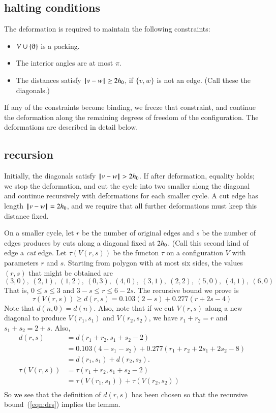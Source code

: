 \subsection{halting conditions}

The deformation is required to maintain the following
constraints:
\begin{itemize}
\item $V\cup\{\orgn\}$ is a packing.
\item The interior angles are at most $\pi$.
\item The distances satisfy ${\hskip0.1em|\hskip-0.15em|\hskip0.1em}v - w{\hskip0.1em|\hskip-0.15em|\hskip0.1em}\ge 2{h_0}$, if $\{v,w\}$ is
not an edge.  (Call these the diagonals.)
\end{itemize}
If any of the constraints become binding, we freeze that
constraint, and continue the deformation along the remaining degrees of freedom of the configuration.  The deformations are described in detail below.

\subsection{recursion}

Initially, the diagonals satisfy ${\hskip0.1em|\hskip-0.15em|\hskip0.1em}v - w{\hskip0.1em|\hskip-0.15em|\hskip0.1em}>2{h_0}$.
If after deformation, equality holds; we stop the deformation, and cut the cycle into two smaller along the diagonal
and continue recursively with deformations for each smaller cycle.  A cut edge has length ${\hskip0.1em|\hskip-0.15em|\hskip0.1em}v - w{\hskip0.1em|\hskip-0.15em|\hskip0.1em}=2{h_0}$, and
we require that all further deformations must keep this distance fixed.  

On a smaller cycle, let $r$ be the number of original edges and $s$ be the number of edges produces by cuts along a diagonal fixed at $2{h_0}$.  (Call this second kind of edge a {\it cut} edge.  Let $\tau(V(r,s))$ be the functon $\tau$ on a configuration $V$ with parameters $r$ and $s$.  Starting from polygon with at most six sides, the values $(r,s)$ that might be obtained are
$$
(3,0),~(2,1),~(1,2),~(0,3),~
(4,0),~(3,1),~(2,2),~
(5,0),~(4,1),~
(6,0)
$$
That is, $0\le s\le 3$ and $3-s\le r\le 6-2s$.
The recursive bound we prove is
\begin{equation}\label{eqn:drs}
\tau(V(r,s)) \ge d(r,s) = 0.103 (2-s) + 0.277 (r+2s-4) 
\end{equation}
Note that $d(n,0) = d(n)$. Also, note that if we cut
$V(r,s)$ along a new diagonal to produce $V(r_1,s_1)$
and $V(r_2,s_2)$, we have $r_1+r_2=r$ and $s_1+s_2 = 2+s$.
Also,
\begin{equation}\label{eqn:drs-add}
\begin{array}{lll}
d(r,s) &= d(r_1+r_2,s_1+s_2-2) \\
  &=0.103 (4-s_1-s_2) + 0.277 (r_1+r_2+2s_1+2s_2-8) \\
  &=d(r_1,s_1) + d(r_2,s_2).\\
\tau(V(r,s)) &= \tau(r_1+r_2,s_1+s_2-2)\\
  &=\tau(V(r_1,s_1)) +\tau(V(r_2,s_2))\\
\end{array}
\end{equation}
So we see that the definition of $d(r,s)$ has been
chosen so that the recursive 
bound~(\ref{eqn:drs}) implies the
lemma.

